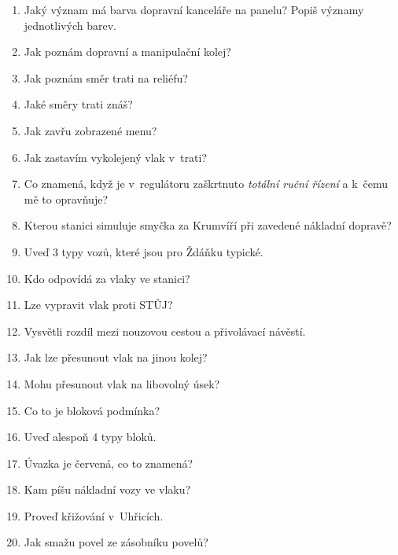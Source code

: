 \documentclass[12pt,a4paper]{article}
\begin{document}
\begin{enumerate}[leftmargin=*]
	\item Jaký význam má barva dopravní kanceláře na panelu? Popiš významy jednotlivých barev.
	
	\item Jak poznám dopravní a manipulační kolej?
	
	\item Jak poznám směr trati na reliéfu?
	
	\item Jaké směry trati znáš?
	
	\item Jak zavřu zobrazené menu?
	
	\item Jak zastavím vykolejený vlak v~trati?
	
	\item Co znamená, když je v~regulátoru zaškrtnuto \textit{totální ruční řízení} a k~čemu mě to opravňuje?
	
	\item Kterou stanici simuluje smyčka za Krumvíří při zavedené nákladní dopravě?
	
	\item Uveď 3 typy vozů, které jsou pro Ždáňku typické.
	
	\item Kdo odpovídá za vlaky ve stanici?
	
	\item Lze vypravit vlak proti STŮJ?
	
	\item Vysvětli rozdíl mezi nouzovou cestou a přivolávací návěstí.
	
	\item Jak lze přesunout vlak na jinou kolej?

	\item Mohu přesunout vlak na libovolný úsek?
	
	\item Co to je bloková podmínka?
	
	\item Uveď alespoň 4 typy bloků.
	
	\item Úvazka je červená, co to znamená?
	
	\item Kam píšu nákladní vozy ve vlaku?
	
	\item Proveď křižování v~Uhřicích.
	
	\item Jak smažu povel ze zásobníku povelů?
	

\end{enumerate}
\end{document}
